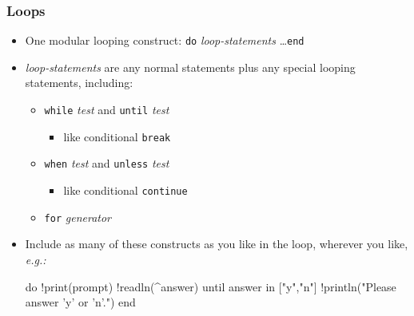 \documentclass[12pt]{beamer}
\begin{document}
\begin{frame}[fragile]
\frametitle{Loops}
\begin{itemize}
\item One modular looping construct:
  \texttt{do} \emph{loop-statements} \ldots \texttt{end}
\item \emph{loop-statements} are any normal statements plus any
  special looping statements, including:
  \begin{itemize}
  \item \texttt{while} \emph{test} and \texttt{until} \emph{test}
    \begin{itemize}
    \item like conditional \texttt{break}
    \end{itemize}
  \item \texttt{when} \emph{test} and \texttt{unless} \emph{test}
    \begin{itemize}
    \item like conditional \texttt{continue}
    \end{itemize}
  \item \texttt{for} \emph{generator}
  \end{itemize}
\item Include as many of these constructs as you like in the loop,
  wherever you like, \emph{e.g.:} \\
\begin{semiverbatim}
    do  !print(prompt)
        !readln(\^{ }answer)
        until answer in ["y","n"]
        !println("Please answer 'y' or 'n'.")
    end
\end{semiverbatim}
\end{itemize}
\end{frame}
\end{document}
